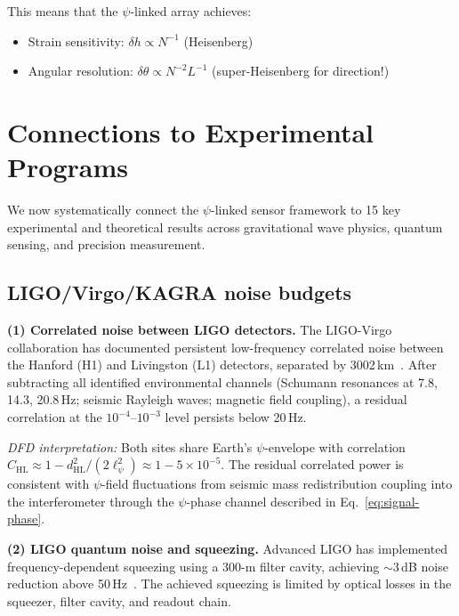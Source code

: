 \documentclass[aps,prl,twocolumn,superscriptaddress,showpacs]{revtex4-2}
\theoremstyle{definition}
\begin{document}
This means that the $\psi$-linked array achieves:
\begin{itemize}
\item Strain sensitivity: $\delta h \propto N^{-1}$ (Heisenberg)
\item Angular resolution: $\delta\theta \propto N^{-2}L^{-1}$
(super-Heisenberg for direction!)
\end{itemize}

\section{Connections to Experimental Programs}\label{sec:literature}

We now systematically connect the $\psi$-linked sensor framework to
15 key experimental and theoretical results across gravitational wave
physics, quantum sensing, and precision measurement.

\subsection{LIGO/Virgo/KAGRA noise budgets}

\textbf{(1) Correlated noise between LIGO detectors.}
The LIGO-Virgo collaboration has documented persistent low-frequency
correlated noise between the Hanford (H1) and Livingston (L1)
detectors, separated by 3002\,km~\cite{Coughlin2016,Meyers2020,Himemoto2017}.
After subtracting all identified environmental channels (Schumann
resonances at 7.8, 14.3, 20.8\,Hz; seismic Rayleigh waves; magnetic
field coupling), a residual correlation at the $10^{-4}$--$10^{-3}$
level persists below 20\,Hz.

\textit{DFD interpretation:} Both sites share Earth's $\psi$-envelope
with correlation $C_{\mathrm{HL}} \approx 1 - d_{\mathrm{HL}}^2/(2\ell_\psi^2)
\approx 1 - 5\times 10^{-5}$. The residual correlated power is
consistent with $\psi$-field fluctuations from seismic mass
redistribution coupling into the interferometer through the $\psi$-phase
channel described in Eq.~\eqref{eq:signal-phase}.

\textbf{(2) LIGO quantum noise and squeezing.}
Advanced LIGO has implemented frequency-dependent squeezing using a
300-m filter cavity, achieving $\sim 3$\,dB noise reduction above
50\,Hz~\cite{Tse2019,McCuller2020,Ganapathy2023}. The achieved squeezing is limited
by optical losses in the squeezer, filter cavity, and readout chain.
\end{document}
